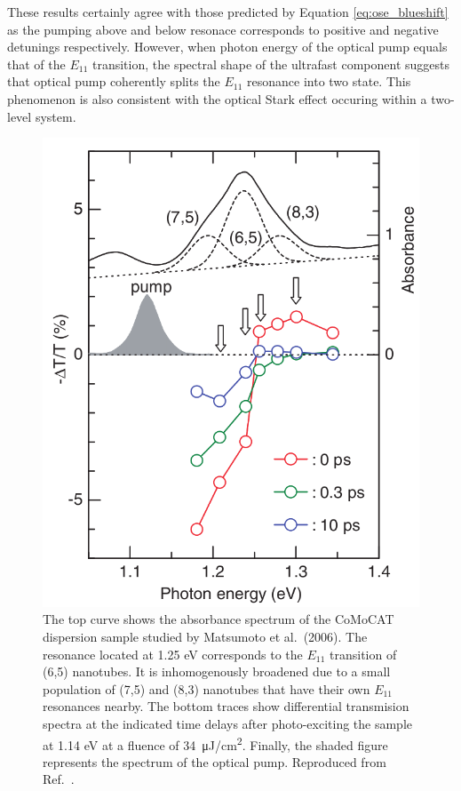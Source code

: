 These results certainly agree with those predicted by Equation \eqref{eq:ose_blueshift} as the pumping above and below resonace corresponds to positive and negative detunings respectively. However, when photon energy of the optical pump equals that of the $E_{11}$ transition, the spectral shape of the ultrafast component suggests that optical pump coherently splits the $E_{11}$ resonance into two state. This phenomenon is also consistent with the optical Stark effect occuring within a two-level system.

\begin{figure}[H]
	\centering
	\includegraphics[scale=1.25]{images/chapter_prior_works/abs_dtt_matsumoto}
	\caption{The top curve shows the absorbance spectrum of the CoMoCAT dispersion sample studied by Matsumoto et al.\ (2006). The resonance located at 1.25 eV corresponds to the $E_{11}$ transition of (6,5) nanotubes. It is inhomogenously broadened due to a small population of (7,5) and (8,3) nanotubes that have their own $E_{11}$ resonances nearby. The bottom traces show differential transmision spectra at the indicated time delays after photo-exciting the sample at 1.14 eV at a fluence of \SI{34}{\micro \joule / \cm\squared}. Finally, the shaded figure represents the spectrum of the optical pump. Reproduced from Ref.\ \cite{matsumoto2006optical}.}
	\label{fig:abs_dtt_matsumoto}
\end{figure}


